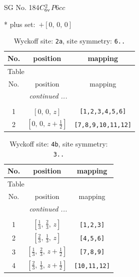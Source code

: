 \documentclass[fleqn,8pt]{jsarticle}
\begin{document}
\setcounter{MaxMatrixCols}{32}

\renewcommand{\tablename}{Table~}
\renewcommand{\figurename}{Figure~}
\begin{center}
\LARGE
SG No. 184\quad$C_{\rm 6v}^{2}$\quad$P6cc$\quad[ hexagonal ]
\end{center}
* plus set:\,\,\,$+\left[ 0,\, 0,\, 0 \right]$
\renewcommand{\arraystretch}{1.2}
\begin{longtable}{ccc}
\caption{Wyckoff site: {\tt 2a}, site symmetry: {\tt 6..}}
 \\
 \hline \hline
No. & position & mapping \\ \hline \endfirsthead

\multicolumn{2}{l}{\tablename\ \thetable{}} \\
 \hline \hline
No. & position & mapping \\ \hline \endhead

 \hline \hline
\multicolumn{2}{r}{\footnotesize\it continued ...} \\ \endfoot

 \hline \hline
\multicolumn{2}{r}{} \\ \endlastfoot

1 & $\left[ 0,\, 0,\, z \right]$ & {\tt [1,2,3,4,5,6]} \\ \hline
2 & $\left[ 0,\, 0,\, z + \frac{1}{2} \right]$ & {\tt [7,8,9,10,11,12]} \\
\end{longtable}
\renewcommand{\arraystretch}{1.2}
\begin{longtable}{ccc}
\caption{Wyckoff site: {\tt 4b}, site symmetry: {\tt 3..}}
 \\
 \hline \hline
No. & position & mapping \\ \hline \endfirsthead

\multicolumn{2}{l}{\tablename\ \thetable{}} \\
 \hline \hline
No. & position & mapping \\ \hline \endhead

 \hline \hline
\multicolumn{2}{r}{\footnotesize\it continued ...} \\ \endfoot

 \hline \hline
\multicolumn{2}{r}{} \\ \endlastfoot

1 & $\left[ \frac{1}{3},\, \frac{2}{3},\, z \right]$ & {\tt [1,2,3]} \\ \hline
2 & $\left[ \frac{2}{3},\, \frac{1}{3},\, z \right]$ & {\tt [4,5,6]} \\ \hline
3 & $\left[ \frac{1}{3},\, \frac{2}{3},\, z + \frac{1}{2} \right]$ & {\tt [7,8,9]} \\ \hline
4 & $\left[ \frac{2}{3},\, \frac{1}{3},\, z + \frac{1}{2} \right]$ & {\tt [10,11,12]} \\
\end{longtable}
\end{document}
